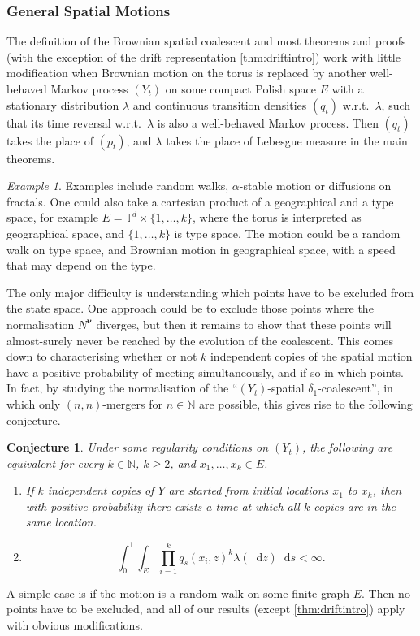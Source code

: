 \documentclass[reqno,draft]{amsart}
\numberwithin{equation}{section}
\theoremstyle{plain}
\newtheorem{conjecture}[theorem]{Conjecture}
\theoremstyle{remark}
\newtheorem{example}[theorem]{Example}
\newcommand{\N}{\mathbb{N}} %
\newcommand*\diff{\mathop{}\!\mathrm{d}}
\begin{document}
\subsubsection{General Spatial Motions}\label{sec:generalmotion}
The definition of the Brownian spatial coalescent and most theorems and proofs (with the exception of the drift representation \cref{thm:driftintro}) work with little modification when Brownian motion on the torus is replaced by another well-behaved Markov process $(Y_t)$ on some compact Polish space $E$ with a stationary distribution $\lambda$ and continuous transition densities $(q_t)$ w.r.t.\ $\lambda$, such that its time reversal w.r.t.\ $\lambda$ is also a well-behaved Markov process. Then $(q_t)$ takes the place of $(p_t)$, and $\lambda$ takes the place of Lebesgue measure in the main theorems.

\begin{example}
    Examples include random walks, $\alpha$-stable motion or diffusions on fractals. One could also take a cartesian product of a geographical and a type space, for example $E = \mathbb{T}^d \times \{1, \ldots ,k\}$, where the torus is interpreted as geographical space, and $\{1, \ldots ,k\}$ is type space. The motion could be a random walk on type space, and Brownian motion in geographical space, with a speed that may depend on the type.
\end{example}

The only major difficulty is understanding which points have to be excluded from the state space. One approach could be to exclude those points where the normalisation $N^{\boldsymbol \nu}$ diverges, but then it remains to show that these points will almost-surely never be reached by the evolution of the coalescent.
This comes down to characterising whether or not $k$ independent copies of the spatial motion have a positive probability of meeting simultaneously, and if so in which points.
In fact, by studying the normalisation of the ``$(Y_t)$-spatial $\delta_1$-coalescent'', in which only $(n,n)$-mergers for $n\in \N$ are possible, this gives rise to the following conjecture.

\begin{conjecture}
    Under some regularity conditions on $(Y_t)$, the following are equivalent for every $k\in \N$, $k \ge 2$, and $x_1, \ldots ,x_k \in E$.
    \begin{enumerate}
        \item If $k$ independent copies of $Y$ are started from initial locations $x_1$ to $x_k$, then with positive probability there exists a time at which all $k$ copies are in the same location.
        \item \[
            \int_0^1 \int_E \prod_{i=1}^k q_s(x_i,z)^k\lambda(\diff z) \diff s < \infty.
        \]
    \end{enumerate}
\end{conjecture}
A simple case is if the motion is a random walk on some finite graph $E$. Then no points have to be excluded, and all of our results (except \cref{thm:driftintro}) apply with obvious modifications.
\end{document}
